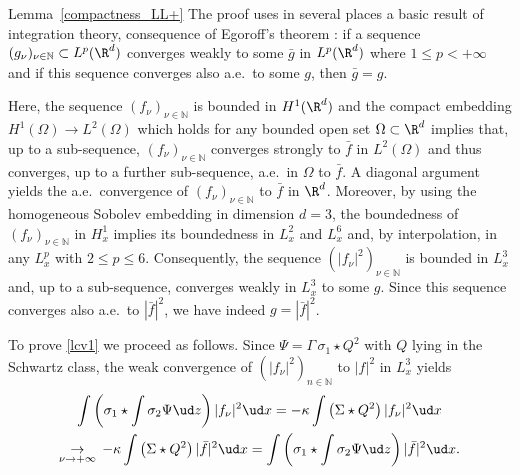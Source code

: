 \begin{ProofOf}{Lemma~\ref{compactness_LL+}}
The proof uses in several places a basic result of integration theory,
consequence of
Egoroff's theorem \cite[Prop.\,3.9]{Tay}: if a sequence $(g_{\nu})_{\nu\in\mathbb N}\subset L^{p}(\R^{d})$ converges weakly to some $\bar{g}$ in $L^{p}(\R^{d})$ where $1\leq p<+\infty$ and if this sequence converges also a.e.\ to some $g$, then $\bar{g}=g$.

Here, the sequence $(f_{\nu})_{\nu\in \mathbb N}$ is bounded in $H^{1}(\R^{d})$
and the compact embedding $H^{1}(\Omega)\to L^{2}(\Omega)$
which holds for any bounded open set $\Omega\subset\R^{d}$ implies that, up to a sub-sequence, $(f_{\nu})_{\nu\in\mathbb N}$ converges strongly to $\bar{f}$ in $L^{2}(\Omega)$ and thus converges, up to a further sub-sequence, a.e.\ in $\Omega$ to $\bar{f}$.
A diagonal argument yields the a.e.\ convergence of $(f_{\nu})_{\nu\in\mathbb N}$ to $\bar{f}$ in $\R^{d}$.
Moreover, by using the homogeneous Sobolev embedding in dimension $d=3$, the boundedness of $(f_{\nu})_{\nu\in\mathbb N}$ in $H_{x}^{1}$ implies its boundedness in $L_{x}^{2}$ and $L_{x}^{6}$ and, by interpolation, in any $L_{x}^{p}$ with $2\leq p\leq 6$. Consequently, the sequence $(|f_{\nu}|^{2})_{\nu\in\mathbb N}$ is bounded in $L_{x}^{3}$ and, up to a sub-sequence, converges weakly in $L_{x}^{3}$ to some $g$. Since this sequence converges also a.e.\ to $|\bar{f}|^{2}$, we have indeed $g=|\bar{f}|^{2}$.

To prove \eqref{lcv1} we proceed as follows.
Since $\Psi=\Gamma\,\sigma_{1}\star Q^{2}$ with $Q$ lying in the Schwartz class, the weak convergence of $(|f_{\nu}|^{2})_{n\in \mathbb N}$ to $|f|^{2}$ in $L_{x}^{3}$ yields
\begin{multline*}
\int\left(\sigma_{1}\star\int\sigma_{2}\Psi\ud z\right)|f_{\nu}|^{2}\ud x=-\kappa\int\left(\Sigma\star Q^{2}\right)|f_{\nu}|^{2}\ud x\\
\underset{\nu\to+\infty}{\to}\,-\kappa\int\left(\Sigma\star Q^{2}\right)|\bar{f}|^{2}\ud x=\int\left(\sigma_{1}\star\int\sigma_{2}\Psi\ud z\right)|\bar{f}|^{2}\ud x.
\end{multline*}


\end{ProofOf}
